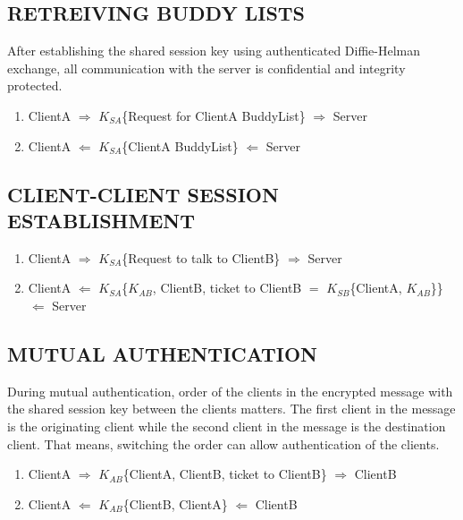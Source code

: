 \documentclass[twoside,letterpaper]{article}
\begin{document}
\bigskip
 
\subsection{RETREIVING BUDDY LISTS}
After establishing the shared session key using authenticated Diffie-Helman exchange, all communication with the server is confidential and integrity protected.

\bigskip

\begin{enumerate}
\item ClientA $\Rightarrow$ $K_{SA}$\{Request for ClientA BuddyList\} $\Rightarrow$ Server
\item ClientA $\Leftarrow$ $K_{SA}$\{ClientA BuddyList\} $\Leftarrow$ Server
\end{enumerate}
 
 \bigskip
 
\subsection{CLIENT-CLIENT SESSION ESTABLISHMENT}

\bigskip

\begin{enumerate}
\item ClientA $\Rightarrow$ $K_{SA}$\{Request to talk to ClientB\} $\Rightarrow$ Server
\item ClientA $\Leftarrow$ $K_{SA}$\{$K_{AB}$, ClientB, ticket to ClientB $=$ $K_{SB}$\{ClientA, $K_{AB}$\}\} $\Leftarrow$ Server
\end{enumerate}

\bigskip
 
\subsection{MUTUAL AUTHENTICATION}
During mutual authentication, order of the clients in the encrypted message with the shared session key between
the clients matters. The first client in the message is the originating client while the second client in the message
is the destination client. That means, switching the order can allow authentication of the clients.

\bigskip

\begin{enumerate}
\item ClientA $\Rightarrow$ $K_{AB}$\{ClientA, ClientB, ticket to ClientB\}  $\Rightarrow$ ClientB
\item ClientA $\Leftarrow$ $K_{AB}$\{ClientB, ClientA\} $\Leftarrow$ ClientB
\end{enumerate}
 
\end{document}
